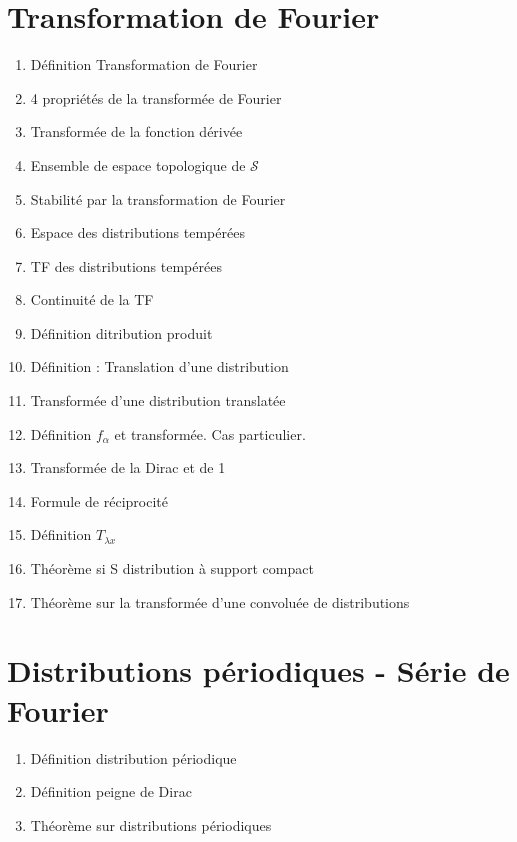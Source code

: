 \documentclass{article}
\begin{document}
\section{Transformation de Fourier}
\begin{enumerate}
\item Définition Transformation de Fourier
\item 4 propriétés de la transformée de Fourier
\item Transformée de la fonction dérivée
\item Ensemble de espace topologique de $\mathcal{S}$
\item Stabilité par la transformation de Fourier
\item Espace des distributions tempérées
\item TF des distributions tempérées
\item Continuité de la TF
\item Définition ditribution produit
\item Définition : Translation d'une distribution
\item Transformée d'une distribution translatée
\item Définition $f_{\alpha}$ et transformée. Cas particulier.
\item Transformée de la Dirac et de 1
\item Formule de réciprocité
\item Définition $T_{\lambda x}$
\item Théorème si S distribution à support compact
\item Théorème sur la transformée d'une convoluée de distributions
\end{enumerate}

\section{Distributions périodiques - Série de Fourier}
\begin{enumerate}
\item Définition distribution périodique
\item Définition peigne de Dirac
\item Théorème sur distributions périodiques
\end{enumerate}

\newpage
\end{document}

